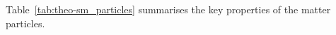
\noindent
Table~\ref{tab:theo-sm_particles} summarises the key properties of the matter particles.

